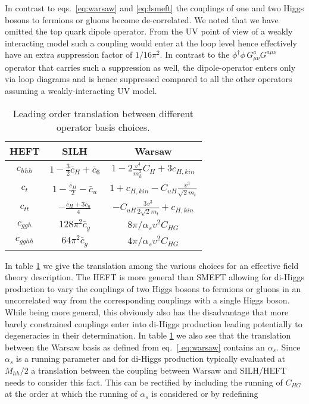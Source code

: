 In contrast to eqs.~\eqref{eq:warsaw} and \eqref{eq:lsmeft} the couplings of one and two Higgs bosons to fermions or gluons become de-correlated. We noted that we have omitted the top quark dipole operator. From the UV point of view of a weakly interacting model such a coupling would enter at the loop level hence effectively have an extra suppression factor of $1/16\pi^2$. In contrast to the $\phi^\dagger\phi\, G^a_{\mu\nu}G^{a\mu\nu}$ operator that carries such a suppression as well, the dipole-operator enters only via loop diagrams and is hence suppressed compared to all the other operators assuming a weakly-interacting UV model.
\begin{table}[htb]
	\begin{center}
		\begin{tabular}{ |c | c |c| }
			\hline
			HEFT& SILH&Warsaw\\
			\hline
			$c_{hhh}$ & $1-\frac{3}{2}\bar c_H +\bar c_6$&$1-2\frac{v^4}{m_h^2}C_H+3c_{H,kin}$ \\
			\hline
			$c_t$ & $1-\frac{\bar c_H}{2}-\bar c_u $& $1+c_{H,kin} -C_{uH} \frac{v^3}{\sqrt{2} m_t}$\\
			\hline
			$ c_{tt} $ & $-\frac{\bar c_H + 3\bar c_u}{4} $ &$-C_{uH} \frac{3 v^3}{2\sqrt{2} m_t} + c_{H,kin}$\\
			\hline
			$c_{ggh}$ & $128\pi^2\bar c_g $ & $8\pi/\alpha_s v^2 C_{HG}$ \\
			\hline
			$c_{gghh}$ & $ 64\pi^2\bar c_g$ & $4\pi/\alpha_s v^2 C_{HG}$ \\
			\hline
		\end{tabular}
	\end{center}
	\caption{Leading order translation between different operator basis choices.\label{tab:translation}}
\end{table}
In table \ref{tab:translation} we give the translation among the various choices for an effective field theory description.
The HEFT is more general than SMEFT allowing for di-Higgs production to vary the couplings of two Higgs bosons
to fermions or gluons in an uncorrelated way from the corresponding couplings with a single Higgs boson.
While being more general, this obviously also has the disadvantage that more barely constrained couplings enter 
into di-Higgs production leading potentially to degeneracies in their determination.
In table \ref{tab:translation} we also see that the translation between the Warsaw basis as defined from eq.~\eqref{ eq:warsaw}
contains an $\alpha_s$. Since $\alpha_s$ is a running parameter and for di-Higgs production typically evaluated at $M_{hh}/2$ a translation between the coupling between Warsaw and SILH/HEFT needs to consider this fact. This can be rectified by including the running of $C_{HG}$ at the order at which the running of $\alpha_s$ is considered or by redefining 
